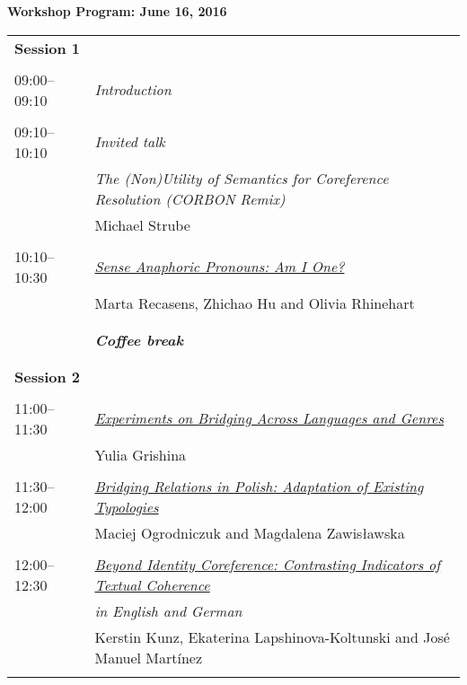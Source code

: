 \setlength{\parindent}{0in}
\setlength{\parskip}{2ex}
\renewcommand{\baselinestretch}{0.87}

\begin{center}
{\Large \bf
  Workshop Program: June 16, 2016
}
\end{center}
\vspace{3mm}
\begin{tabular}{p{20mm}p{128mm}}
{\bf Session 1} \\
\\
09:00--09:10 & {\em Introduction} \\
\\
09:10--10:10 & {\em Invited talk} \\[5pt]
         & \em{The (Non)Utility of Semantics for Coreference Resolution (CORBON Remix)} \\
         & Michael Strube\\
\\
10:10--10:30 & \hyperlink{page.1}{\em Sense Anaphoric Pronouns: Am I One?}\\
         & Marta Recasens, Zhichao Hu and Olivia Rhinehart \\
\\
\\ & {\bf\em Coffee break} \\[1pt]
\\[1pt]
\\
{\bf Session 2} \\
\\
11:00--11:30 & \hyperlink{page.7}{\em Experiments on Bridging Across Languages and Genres}\\
         & Yulia Grishina \\
\\

11:30--12:00 & \hyperlink{page.16}{\em Bridging Relations in Polish: Adaptation of Existing Typologies}\\
         & Maciej Ogrodniczuk and Magdalena Zawis{\l}awska \\
\\

12:00--12:30 & \hyperlink{page.23}{\em Beyond Identity Coreference: Contrasting Indicators of Textual Coherence} \\
             & \em{in English and German}\\
         & Kerstin Kunz, Ekaterina Lapshinova-Koltunski and Jos\'{e} Manuel Mart\'{i}nez \\
\\


\end{tabular}

